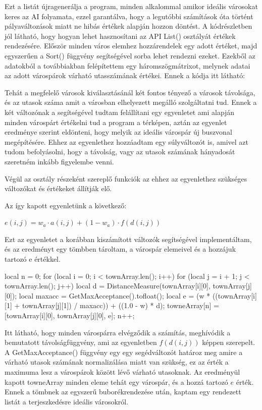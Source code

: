 Ezt a listát újragenerálja a program, minden alkalommal amikor ideális városokat keres az AI folyamata, ezzel garantálva, hogy a legutóbbi számítások óta történt pályaváltozások miatt ne hibás értékek alapján hozzon döntést. A kódrészletben jól látható, hogy hogyan lehet hasznosítani az API List() osztályát értékek rendezésére. Először minden város elemhez hozzárendelek egy adott értéket, majd egyszerűen a Sort() függvény segítségével sorba lehet rendezni ezeket. Ezekből az adatokból a továbbiakban felépítettem egy háromszögmátrixot, melynek adatai az adott várospárok várható utasszámának értékei. Ennek a kódja itt látható:

Tehát a megfelelő városok kiválasztásánál két fontos tényező a városok távolsága, és az utasok száma amit a városban elhelyezett megálló szolgáltatni tud. Ennek a két változónak a segítségével tudtam felállítani egy egyenletet ami alapján minden várospárt értékelni tud a program a térképen, aztán az egyenlet eredménye szerint eldönteni, hogy melyik az ideális várospár új buszvonal megépítésére. Ehhez az egyenlethez hozzáadtam egy súlyváltozót is, amivel azt tudom befolyásolni, hogy a távolság, vagy az utasok számának hányadosát szeretném inkább figyelembe venni.

Végül az osztály részeként szereplő funkciók az ehhez az egyenlethez szükséges változókat és értékeket állítják elő.

Az így kapott egyenletünk a következő:
\begin{center}
	$ e(i,j)=w_{a} \cdot a(i,j)+(1-w_{a}) \cdot f(d(i,j)) $
\end{center}

Ezt az egyenletet a korábban kiszámított változók segítségével implementáltam, és az eredményt egy tömbben tároltam, a várospár elemeivel és a hozzájuk tartozó e értékkel.

\begin{cpp}
local n = 0;
for (local i = 0; i < townArray.len(); i++) {
  for (local j = i + 1; j < townArray.len(); j++) {
    local d = DistanceMeasure(townArray[i][0], townArray[j][0]);
    local maxacc = GetMaxAcceptance().tofloat();
    local e = (w * ((townArray[i][1] + townArray[j][1]) / maxacc))
      + ((1.0 - w) * d);
    towneArray[n] = [townArray[i][0], townArray[j][0], e];
    n++;
  }
}
\end{cpp}

Itt látható, hogy minden várospárra elvégződik a számítás, meghívódik a bemutatott távolságfüggvény, ami az egyenletben $f(d(i,j))$ képpen szerepelt. A GetMaxAcceptance() függvény egy egy segédváltozót határoz meg amire a várható utasok számának normalizálása miatt van szükség, ez az érték a maximuma lesz a várospárok között lévő várható utasoknak. Az eredményül kapott towneArray minden eleme tehát egy várospár, és a hozzá tartozó $e$ érték. Ennek a tömbnek az egyszerű buborékrendezése után, kaptam egy rendezett listát a terjeszkedésre ideális városokról.

